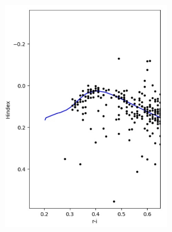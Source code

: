 \documentclass{beamer}
\begin{document}
    \begin{frame}
        \begin{columns}
            \begin{column}{0.333\textwidth}
                \begin{figure}
                    \centering
                    \includegraphics[width=0.8\textwidth]{pictures/Isoh1.jpg}
                \end{figure}
            \end{column}
            \begin{column}{0.333\textwidth}
                \begin{figure}
                    \centering

\end{figure}
\end{column}
\end{columns}
\end{frame}
\end{document}
